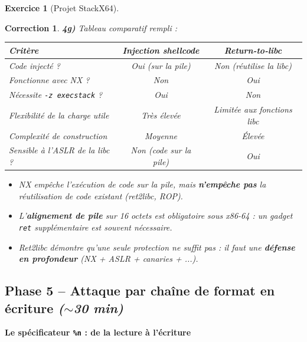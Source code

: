 \documentclass[a4paper,11pt]{article}
\theoremstyle{plain}
\newtheorem{correction}{Correction}
\theoremstyle{definition}
\newtheorem{exercice}{Exercice}
\begin{document}
\begin{exercice}[Projet StackX64]
\begin{correction}
\textbf{4g)} Tableau comparatif rempli :
\begin{center}
\begin{tabular}{lcc}
\toprule
\textbf{Critère} & \textbf{Injection shellcode} & \textbf{Return-to-libc} \\
\midrule
Code injecté ? & Oui (sur la pile) & Non (réutilise la libc) \\
Fonctionne avec NX ? & Non & Oui \\
Nécessite \texttt{-z execstack} ? & Oui & Non \\
Flexibilité de la charge utile & Très élevée & Limitée aux fonctions libc \\
Complexité de construction & Moyenne & Élevée \\
Sensible à l'ASLR de la libc ? & Non (code sur la pile) & Oui \\
\bottomrule
\end{tabular}
\end{center}

\begin{pointcle}
\begin{itemize}
    \item NX empêche l'exécution de code sur la pile, mais \textbf{n'empêche pas} la réutilisation de code existant (ret2libc, ROP).
    \item L'\textbf{alignement de pile} sur 16 octets est obligatoire sous x86-64 : un gadget \texttt{ret} supplémentaire est souvent nécessaire.
    \item Ret2libc démontre qu'une seule protection ne suffit pas : il faut une \textbf{défense en profondeur} (NX + ASLR + canaries + ...).
\end{itemize}
\end{pointcle}

\end{correction}



\subsection*{Phase 5 -- Attaque par chaîne de format en écriture \hfill\normalfont\textit{($\sim$30 min)}}

\begin{rappel}
\textbf{Le spécificateur \texttt{\%n} : de la lecture à l'écriture}


\end{rappel}
\end{exercice}
\end{document}
